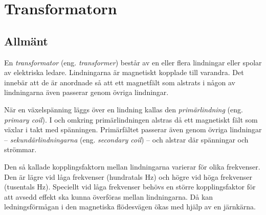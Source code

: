 

\section{Transformatorn}
\label{sec:transformator}

\subsection{Allmänt}

En \emph{transformator} (eng. \emph{transformer}) består av en eller flera
lindningar eller spolar av elektriska ledare.
Lindningarna är magnetiskt kopplade till varandra.
Det innebär att de är anordnade så att ett magnetfält som alstrats i någon
av lindningarna även passerar genom övriga lindningar.

När en växelspänning läggs över en lindning kallas den \emph{primärlindning}
(eng. \emph{primary coil}).
I och omkring primärlindningen alstras då ett magnetiskt fält som växlar i takt
med spänningen. Primärfältet passerar även genom övriga lindningar --
\emph{sekundärlindningarna} (eng. \emph{secondary coil}) -- och alstrar där
spänningar och strömmar.

Den så kallade kopplingsfaktorn mellan lindningarna
varierar för olika frekvenser.
Den är lägre vid låga frekvenser (hundratals \unit{\hertz}) och högre vid höga
frekvenser (tusentals \unit{\hertz}).
Speciellt vid låga frekvenser behövs en större kopplingsfaktor för att avsedd
effekt ska kunna överföras mellan lindningarna. Då kan ledningsförmågan i den
magnetiska flödesvägen ökas med hjälp av en järnkärna.

